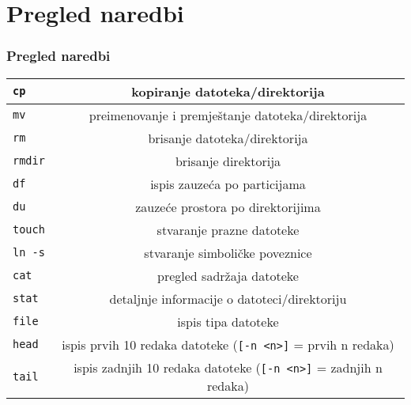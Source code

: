 \documentclass{beamer}
\newcommand{\shell}[1]{\texttt{\small #1}}
\begin{document}
\section{Pregled naredbi}
\begin{frame}[t]
\frametitle{Pregled naredbi}
\begin{tabular}{| l | c |} \hline
  \shell{cp} & kopiranje datoteka/direktorija \\ \hline
  \shell{mv} & preimenovanje i premještanje datoteka/direktorija \\ \hline
  \shell{rm} & brisanje datoteka/direktorija \\ \hline
  \shell{rmdir} & brisanje direktorija \\ \hline
  \shell{df} & ispis zauzeća po particijama \\ \hline
  \shell{du} & zauzeće prostora po direktorijima \\ \hline
  \shell{touch} & stvaranje prazne datoteke \\ \hline
  \shell{ln -s} & stvaranje simboličke poveznice \\ \hline
  \shell{cat} & pregled sadržaja datoteke \\ \hline
  \shell{stat} & detaljnje informacije o datoteci/direktoriju \\ \hline
  \shell{file} & ispis tipa datoteke \\ \hline
  \shell{head} & ispis prvih 10 redaka datoteke (\shell{[-n <n>]} = prvih n redaka) \\ \hline
  \shell{tail} & ispis zadnjih 10 redaka datoteke (\shell{[-n <n>]} = zadnjih n redaka) \\ \hline


\end{tabular}
\end{frame}
\end{document}
